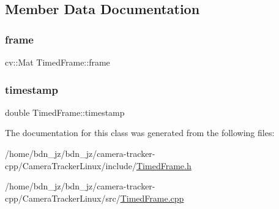\subsection{Member Data Documentation}
\mbox{\label{class_timed_frame_a4c73ac094ec94f9be6558208b4916a36}} 
\subsubsection{\texorpdfstring{frame}{frame}}
{\footnotesize\ttfamily cv\+::\+Mat Timed\+Frame\+::frame}

\mbox{\label{class_timed_frame_a126b8150949e1bd734778de55496b90c}} 
\subsubsection{\texorpdfstring{timestamp}{timestamp}}
{\footnotesize\ttfamily double Timed\+Frame\+::timestamp}



The documentation for this class was generated from the following files\+:\begin{DoxyCompactItemize}
\item 
/home/bdn\+\_\+jz/bdn\+\_\+jz/camera-\/tracker-\/cpp/\+Camera\+Tracker\+Linux/include/\hyperlink{_timed_frame_8h}{Timed\+Frame.\+h}\item 
/home/bdn\+\_\+jz/bdn\+\_\+jz/camera-\/tracker-\/cpp/\+Camera\+Tracker\+Linux/src/\hyperlink{_timed_frame_8cpp}{Timed\+Frame.\+cpp}\end{DoxyCompactItemize}
